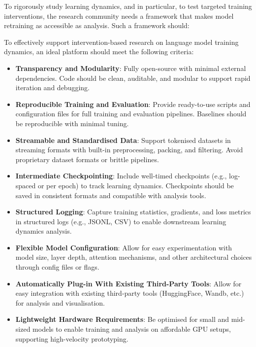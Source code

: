 To rigorously study learning dynamics, and in particular, to test targeted training interventions, the research community needs a framework that makes model retraining as accessible as analysis. Such a framework should:

\begin{tcolorbox}[
    colback=white,
    colframe=thesisblue,
    title=\textbf{Design Requirements for Intervention-Friendly Language Model Platforms},
    fonttitle=\bfseries,
    coltitle=white,
    arc=0mm,
    boxrule=1pt,
    left=10pt,
    right=10pt,
    top=10pt,
    bottom=10pt,
    enhanced,
    breakable
]
To effectively support intervention-based research on language model training dynamics, an ideal platform should meet the following criteria:

\begin{itemize}[label=\cmark]
    \item \textbf{Transparency and Modularity}: Fully open-source with minimal external dependencies. Code should be clean, auditable, and modular to support rapid iteration and debugging.
    
    \item \textbf{Reproducible Training and Evaluation}: Provide ready-to-use scripts and configuration files for full training and evaluation pipelines. Baselines should be reproducible with minimal tuning.
    
    \item \textbf{Streamable and Standardised Data}: Support tokenised datasets in streaming formats with built-in preprocessing, packing, and filtering. Avoid proprietary dataset formats or brittle pipelines.
    
    \item \textbf{Intermediate Checkpointing}: Include well-timed checkpoints (e.g., log-spaced or per epoch) to track learning dynamics. Checkpoints should be saved in consistent formats and compatible with analysis tools.
    
    \item \textbf{Structured Logging}: Capture training statistics, gradients, and loss metrics in structured logs (e.g., JSONL, CSV) to enable downstream learning dynamics analysis.
    
    \item \textbf{Flexible Model Configuration}: Allow for easy experimentation with model size, layer depth, attention mechanisms, and other architectural choices through config files or flags.

    \item \textbf{Automatically Plug-in With Existing Third-Party Tools}: Allow for easy integration with existing third-party tools (HuggingFace, Wandb, etc.) for analysis and visualisation.

    
    \item \textbf{Lightweight Hardware Requirements}: Be optimised for small and mid-sized models to enable training and analysis on affordable GPU setups, supporting high-velocity prototyping.
\end{itemize}
\end{tcolorbox}

